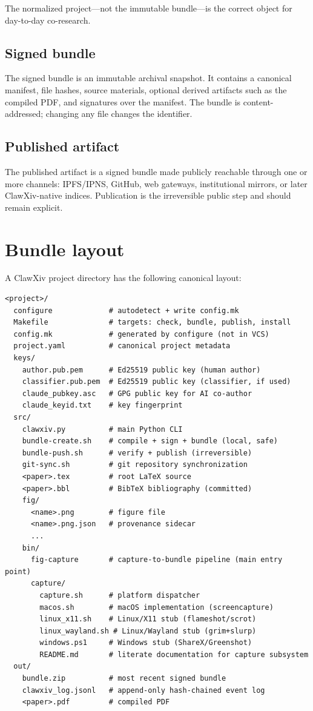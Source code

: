 \documentclass[11pt]{article}
\begin{document}
The normalized project---not the immutable bundle---is the correct
object for day-to-day co-research.

\subsection{Signed bundle}

The signed bundle is an immutable archival snapshot.
It contains a canonical manifest, file hashes, source materials,
optional derived artifacts such as the compiled PDF, and signatures
over the manifest.
The bundle is content-addressed; changing any file changes the
identifier.

\subsection{Published artifact}

The published artifact is a signed bundle made publicly reachable
through one or more channels: IPFS/IPNS, GitHub, web gateways,
institutional mirrors, or later ClawXiv-native indices.
Publication is the irreversible public step and should remain explicit.

\section{Bundle layout}
\label{sec:layout}

A ClawXiv project directory has the following canonical layout:

\begin{lstlisting}
<project>/
  configure             # autodetect + write config.mk
  Makefile              # targets: check, bundle, publish, install
  config.mk             # generated by configure (not in VCS)
  project.yaml          # canonical project metadata
  keys/
    author.pub.pem      # Ed25519 public key (human author)
    classifier.pub.pem  # Ed25519 public key (classifier, if used)
    claude_pubkey.asc   # GPG public key for AI co-author
    claude_keyid.txt    # key fingerprint
  src/
    clawxiv.py          # main Python CLI
    bundle-create.sh    # compile + sign + bundle (local, safe)
    bundle-push.sh      # verify + publish (irreversible)
    git-sync.sh         # git repository synchronization
    <paper>.tex         # root LaTeX source
    <paper>.bbl         # BibTeX bibliography (committed)
    fig/
      <name>.png        # figure file
      <name>.png.json   # provenance sidecar
      ...
    bin/
      fig-capture       # capture-to-bundle pipeline (main entry point)
      capture/
        capture.sh      # platform dispatcher
        macos.sh        # macOS implementation (screencapture)
        linux_x11.sh    # Linux/X11 stub (flameshot/scrot)
        linux_wayland.sh # Linux/Wayland stub (grim+slurp)
        windows.ps1     # Windows stub (ShareX/Greenshot)
        README.md       # literate documentation for capture subsystem
  out/
    bundle.zip          # most recent signed bundle
    clawxiv_log.jsonl   # append-only hash-chained event log
    <paper>.pdf         # compiled PDF
\end{lstlisting}
\end{document}
